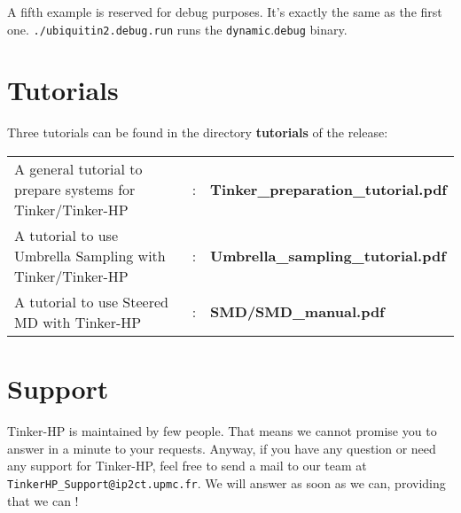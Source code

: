 \documentclass[peerreview]{IEEEtran}
\def\dynamic{\texttt{dynamic}}
\begin{document}
A fifth example is reserved for debug purposes. It's exactly the same as the first one. \texttt{./ubiquitin2.debug.run} runs the \dynamic.\texttt{debug} binary. 


\section{Tutorials}
Three tutorials can be found in the directory \textbf{tutorials} of the release:

\begin{tabular}[t]{lcl}
    A general tutorial to prepare systems for Tinker/Tinker-HP&:& \textbf{Tinker\_preparation\_tutorial.pdf}\\
     A tutorial to use Umbrella Sampling with Tinker/Tinker-HP&:& \textbf{Umbrella\_sampling\_tutorial.pdf}\\
    A tutorial to use Steered MD with Tinker-HP&:& \textbf{SMD/SMD\_manual.pdf}\\
\end{tabular}

\section{Support}

Tinker-HP is maintained by few people. That means we cannot promise you to answer in a minute to your requests. Anyway, if you have any question or need any support for Tinker-HP, feel free to send a mail to our team at \texttt{TinkerHP\_Support@ip2ct.upmc.fr}. We will answer as soon as we can, providing that we can ! 
\end{document}
